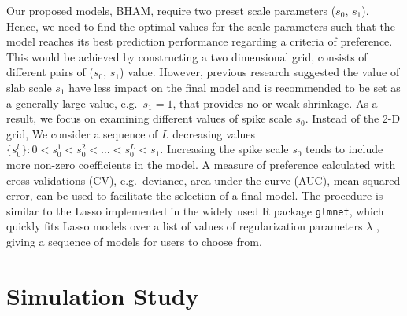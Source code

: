 \documentclass[AMA,STIX1COL,]{WileyNJD-v2}
\begin{document}
\label{sec:tune} Our proposed models, BHAM, require two preset scale
parameters (\(s_0\), \(s_1\)). Hence, we need to find the optimal values
for the scale parameters such that the model reaches its best prediction
performance regarding a criteria of preference. This would be achieved
by constructing a two dimensional grid, consists of different pairs of
(\(s_0\), \(s_1\)) value. However, previous research suggested the value
of slab scale \(s_1\) have less impact on the final model and is
recommended to be set as a generally large value, e.g.~\(s_1 = 1\), that
provides no or weak shrinkage. \citep{Rockova2018} As a result, we focus
on examining different values of spike scale \(s_0\). Instead of the 2-D
grid, We consider a sequence of \(L\) decreasing values
\(\{s_0^l\}: 0 < s_0^1 < s_0^2 < \dots < s_0^L < s_1\). Increasing the
spike scale \(s_0\) tends to include more non-zero coefficients in the
model. A measure of preference calculated with cross-validations (CV),
e.g.~deviance, area under the curve (AUC), mean squared error, can be
used to facilitate the selection of a final model. The procedure is
similar to the Lasso implemented in the widely used R package
\texttt{glmnet}, which quickly fits Lasso models over a list of values
of regularization parameters \(\lambda\) , giving a sequence of models
for users to choose from.

\hypertarget{simulation-study}{%
\section{Simulation Study}\label{simulation-study}}

\label{sec:sim}
\end{document}
